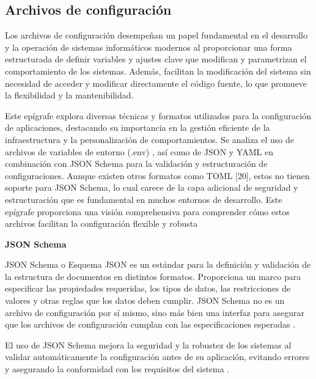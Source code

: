 \subsection{Archivos de configuración}

Los archivos de configuración desempeñan un papel fundamental en el desarrollo y la operación de sistemas informáticos modernos al proporcionar una forma estructurada de definir variables y ajustes clave que modifican y parametrizan el comportamiento de los sistemas. Además, facilitan la modificación del sistema sin necesidad de acceder y modificar directamente el código fuente, lo que promueve la flexibilidad y la mantenibilidad.

Este epígrafe explora diversas técnicas y formatos utilizados para la configuración de aplicaciones, destacando su importancia en la gestión eficiente de la infraestructura y la personalización de comportamientos. Se analiza el uso de archivos de variables de entorno (.env) \autocite{pandey_guide_2022}, así como de JSON \autocite{erickson_what_2024,bray_javascript_2014} y YAML \autocite{ben-kiki_yaml_2021,redhat_what_2023} en combinación con JSON Schema \autocite{attouche_witness_2022,json_schema_json_2024} para la validación y estructuración de configuraciones. Aunque existen otros formatos como TOML [20], estos no tienen soporte para JSON Schema, lo cual carece de la capa adicional de seguridad y estructuración que es fundamental en muchos entornos de desarrollo. Este epígrafe proporciona una visión comprehensiva para comprender cómo estos archivos facilitan la configuración flexible y robusta

\textbf{JSON Schema}

JSON Schema o Esquema JSON es un estándar para la definición y validación de la estructura de documentos en distintos formatos. Proporciona un marco para especificar las propiedades requeridas, los tipos de datos, las restricciones de valores y otras reglas que los datos deben cumplir. JSON Schema no es un archivo de configuración por sí mismo, sino más bien una interfaz para asegurar que los archivos de configuración cumplan con las especificaciones esperadas \autocite{attouche_witness_2022,json_schema_json_2024}.

El uso de JSON Schema mejora la seguridad y la robustez de los sistemas al validar automáticamente la configuración antes de su aplicación, evitando errores y asegurando la conformidad con los requisitos del sistema \autocite{attouche_witness_2022,json_schema_json_2024}.

